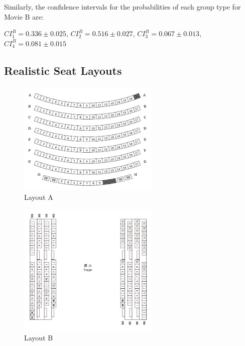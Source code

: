 Similarly, the confidence intervals for the probabilities of each group type for Movie B are:

$CI_1^{B} =  0.336 \pm 0.025$, $CI_2^{B} =  0.516 \pm 0.027$, $CI_3^{B} = 0.067 \pm 0.013$, $CI_4^{B} = 0.081 \pm 0.015$




\subsection{Realistic Seat Layouts}

\begin{figure}[ht]
  \caption{Layout A}
    \centering
      \includegraphics[width=0.6\textwidth]{./Figures/Layouts/Layout_A.png}
\end{figure}
  
\begin{figure}[ht]
  \caption{Layout B}
    \centering
      \includegraphics[width=0.6\textwidth]{./Figures/Layouts/Layout_B.png}
\end{figure}

